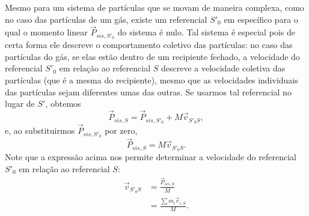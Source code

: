 Mesmo para um sistema de partículas que se movam de maneira complexa, como no caso das partículas de um gás, existe um referencial $S'_0$ em específico para o qual o momento linear $\vec{P}_{sis, S'_0}$ do sistema é nulo. Tal sistema é especial pois de certa forma ele descreve o comportamento coletivo das partículas: no caso das partículas do gás, se elas estão dentro de um recipiente fechado, a velocidade do referencial $S'_0$ em relação ao referencial $S$ descreve a velocidade coletiva das partículas (que é a mesma do recipiente), mesmo que as velocidades individuais das partículas sejam diferentes umas das outras. Se usarmos tal referencial no lugar de $S'$, obtemos
\begin{equation}
    \vec{P}_{sis, S} = \vec{P}_{sis, S'_0} + M \vec{v}_{S'_0S},
\end{equation}
%
e, ao substituirmos $\vec{P}_{sis, S'_0}$ por zero, 
\begin{equation}
     \vec{P}_{sis, S} = M \vec{v}_{S'_0S}.
\end{equation}
%
Note que a expressão acima nos permite determinar a velocidade do referencial $S'_0$ em relação ao referencial $S$:
\begin{align}
    \vec{v}_{S'_0S} &= \frac{\vec{P}_{sis, S}}{M} \label{Eq:MomSis} \\
    &= \frac{\sum m_i \vec{v}_{i,S}}{M}. \label{Eq:SomaVelPart}
\end{align}

